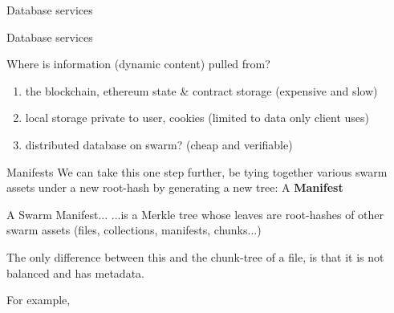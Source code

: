 \documentclass{beamer}
\begin{document}
\begin{section}{Database services}

\begin{frame}{Database services}
\begin{block}{Where is information (dynamic content) pulled from?}
\begin{enumerate}
\item the blockchain, ethereum state \& contract storage (expensive and slow)
\item local storage private to user, cookies (limited to data only client uses)
\item distributed database on swarm? (cheap and verifiable)
\end{enumerate}
\end{block}
\end{frame}


\begin{frame}{Manifests}
 We can take this one step further, be tying together various swarm assets under a new root-hash by generating a new tree: A \textbf{Manifest}\\
 \begin{block}{A Swarm Manifest...}
  ...is a Merkle tree whose leaves are root-hashes of other swarm assets (files, collections, manifests, chunks...)
 \end{block}
 The only difference between this and the chunk-tree of a file, is that it is not balanced and has metadata.
\end{frame}

\begin{frame}
 For example, 
 \end{frame}


\end{section}
\end{document}
